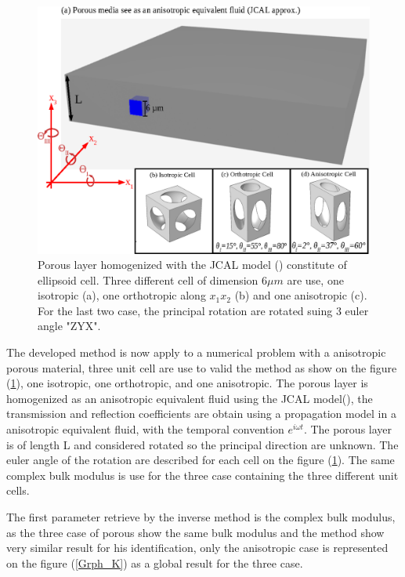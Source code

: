 \documentclass{article}
\begin{document}
    \begin{figure}[ht!]
        \centering
        \includegraphics[scale=0.5]{Material_2.eps}
        \caption{Porous layer homogenized with the JCAL model (\cite{Allard}\cite{Lafarge}\cite{Jhonson}) constitute of ellipsoid cell. Three different cell of dimension $6\mu m$ are use, one isotropic (a), one orthotropic along $x_1x_2$ (b) and one anisotropic (c). For the last two case, the principal rotation are rotated suing 3 euler angle "ZYX".}
        \label{Material}
    \end{figure}
    
    The developed method is now apply to a numerical problem with a anisotropic porous material, three unit cell are use to valid the method as show on the figure (\ref{Material}), one isotropic, one orthotropic, and one anisotropic. The porous layer is homogenized as an anisotropic equivalent fluid using the JCAL model(\cite{Allard}\cite{Lafarge}\cite{Jhonson}), the transmission and reflection coefficients are obtain using a propagation model in a anisotropic equivalent fluid, with the temporal convention $e^{i\omega t}$. The porous layer is of length L and considered rotated so the principal direction are unknown. The euler angle of the rotation are described for each cell on the figure (\ref{Material}). The same complex bulk modulus is use for the three case containing the three different unit cells. 

The first parameter retrieve by the inverse method is the complex bulk modulus, as the three case of porous show the same bulk modulus and the method show very similar result for his identification, only the anisotropic case is represented on the figure (\ref{Grph_K}) as a global result for the three case.
\end{document}
